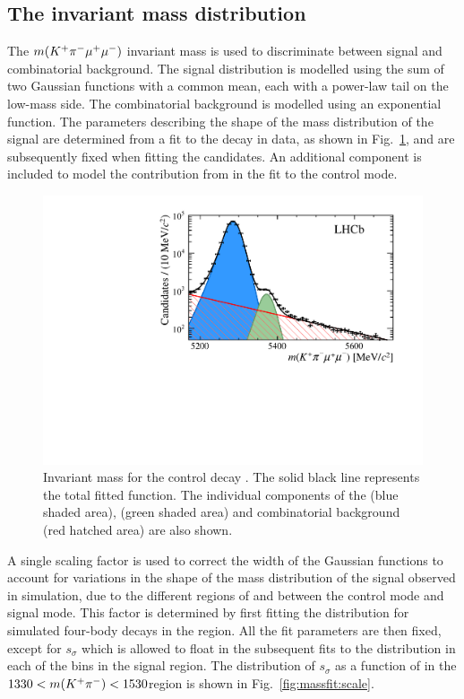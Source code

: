 \subsection[The \mkpimm invariant mass distribution]{The \boldmath{\mkpimm} invariant mass distribution}
\label{sec:kpimm:massfit}

The $m({{K}^+}{{\pi}^-}{\mu^+\mu^-})$ invariant mass is used to discriminate between signal and combinatorial background. The signal distribution is modelled using the sum of two Gaussian functions with a common mean, each with a power-law tail on the low-mass side.  The combinatorial background is modelled using an exponential function.  The parameters describing the shape of the mass distribution of the signal are determined from a fit to the \BdToJPsiKstP decay in data, as shown in Fig.~\ref{fig:massfit:jpsi}, and are subsequently fixed when fitting the \BdToKpimm candidates. An additional component is included to model the contribution from \BsToJPsiKst in the fit to the control mode. 

\begin{figure}[!tb]
\centering
\includegraphics[width=0.7\linewidth]{figs/kpimm/massfit/fit_jpsi_log.pdf}
\caption{Invariant mass \mkpimm for the control decay \BdToJPsiKstP. The solid black line represents the total fitted function.  The individual components of the \BdToJPsiKst (blue shaded area), \BsToJPsiKst (green shaded area) and combinatorial background (red hatched area) are also shown.}
\label{fig:massfit:jpsi}
\end{figure}

A single scaling factor is used to correct the width of the Gaussian functions to account for variations in the shape of the mass distribution of the signal observed in simulation, due to the different regions of \mkpi and \qsq between the control mode and signal mode. This factor is determined by first fitting the \mkpimm distribution for simulated four-body \BdToKpimm decays in the \BdToJPsiKstP region.  All the fit parameters are then fixed, except for $s_{\sigma}$ which is allowed to float in the subsequent fits to the \mkpimm distribution in each of the \qsq bins in the \BdToKpimm signal region. The distribution of $s_{\sigma}$ as a function of \qsq in the $1330<m({{K}^+}{{\pi}^-})<1530$\mevcc region is shown in Fig.~\ref{fig:massfit:scale}.

